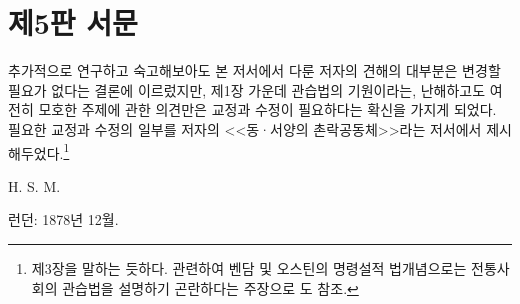 \chapter*{제5판 서문}

추가적으로 연구하고 숙고해보아도
본 저서에서 다룬 저자의 견해의 대부분은
변경할 필요가 없다는 결론에 이르렀지만,
제1장 가운데
관습법의 기원이라는, 난해하고도 여전히 모호한 주제에 관한 의견만은
교정과 수정이 필요하다는 확신을 가지게 되었다.
필요한 교정과 수정의 일부를
저자의
<<동^^b7서양의 촌락공동체>>라는
저서에서 제시해두었다.\footnote{%
   제3장을 말하는 듯하다.
  관련하여 벤담 및 오스틴의 명령설적 법개념으로는
  전통사회의 관습법을 설명하기 곤란하다는 주장으로
  도 참조. }

\begin{flushright}
H. S. M.
\end{flushright}

\begin{footnotesize}
런던: 1878년 12월.
\end{footnotesize}

